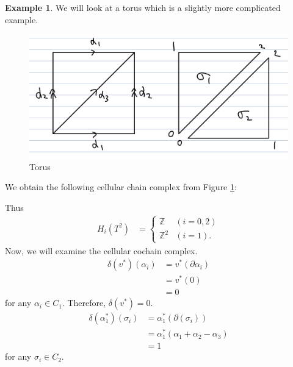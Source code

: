 \documentclass[psamsfonts]{amsart}
\theoremstyle{definition}
\newtheorem{exmp}[thm]{Example}
\theoremstyle{rem}
\numberwithin{equation}{section}
\begin{document}
\begin{exmp}
  We will look at a torus which is a slightly more complicated example.
  \begin{figure}[!htb]
    \includegraphics[width=.5\linewidth]{img/torus.jpeg}
    \caption{Torus}
    \label{fig:torus}
  \end{figure}
  We obtain the following cellular chain complex from Figure \ref{fig:torus}:
  \begin{center}
  \end{center}
  Thus
  \begin{align*}
    H_i(T^2) &= \begin{cases}
      \mathbb{Z}   & (i = 0, 2) \\
      \mathbb{Z}^2 & (i = 1).
    \end{cases}
  \end{align*}
  Now, we will examine the cellular cochain complex.
  \begin{align*}
    \delta(v^{\ast})(\alpha_i)
      &= v^{\ast}(\partial \alpha_i) \\
      &= v^{\ast}(0) \\
      &= 0
  \end{align*}
  for any $\alpha_i \in C_1$.
  Therefore, $\delta(v^{\ast}) = 0$.
  \begin{align*}
    \delta(\alpha_1^{\ast})(\sigma_i)
      &= \alpha_1^{\ast}(\partial(\sigma_i)) \\
      &= \alpha_1^{\ast}(\alpha_1 + \alpha_2 - \alpha_3) \\
      &= 1
  \end{align*}
  for any $\sigma_i \in C_2$.

\end{exmp}
\end{document}
